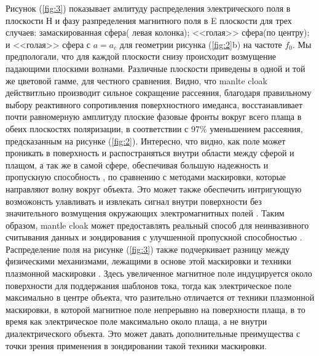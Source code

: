 \documentclass[12pt,a4paper]{article}
\begin{document}
Рисунок (\ref{fig:3}) показывает амлитуду распределения электрического поля в плоскости Н и
фазу разпределения магнитного поля в E плоскости для трех случаев: замаскированная сфера(
левая колонка); <<голая>> сфера(по центру); и <<голая>> сфера с $a=a_c$ для геометрии
рисунка (\ref{fig:2}b) на частоте $f_0$. Мы предпологали, что для каждой плоскости снизу
происходит возмущение падающими плоскими волнами. Различные плоскости приведены в одной и той
же цветовой гамме, для честного сравнения. Видно, что manlte cloak действитльно производит
сильное сокращение рассеяния, благодаря правильному выбору реактивного сопротивления 
поверхностного имеданса, восстанавливает почти равномерную амплитуду плоские фазовые фронты
вокруг всего плаща в обеих плоскостях поляризации, в соответствии с 97\% уменьшением
рассеяния, предсказанным на рисунке (\ref{fig:2}). Интересно, что видно, как поле может
проникать в поверхность и распостраняться внутри области между сферой и плащом, а так же в 
самой сфере, обеспечивая большую надежность и пропускную способность \cite{12}, по сравнению
с методами маскировки, которые направляют волну вокруг объекта. Это может также обеспечить
интригующую возможонсть улавливать и извлекать сигнал внутри поверхности без значительного
возмущения окружающих электромагнитных полей \cite{16}. Таким образом, mantle cloak может
предоставлять реальный способ для неинвазивного считывания данных и зондирования с улучшенной
пропускной способностью \cite{17}. Распределение поля на рисунке (\ref{fig:3}) также 
подчеркивает разницу между физическими механизмами, лежащими в основе этой маскировки и
техники плазмонной маскировки \cite{8}. Здесь увеличенное магнитное поле индуцируется 
около поверхности для поддержания шаблонов тока, тогда как электрическое поле максимально в
центре объекта, что разительно отличается от техники плазмонной маскировки, в которой 
магнитное поле непрерывно на поверхности плаща, в то время как электрическое поле максимально
около плаща, а не внутри диалектрического объекта. Это может давать дополнительные 
преимущества с точки зрения применения в зондировании такой техники маскировки.
\end{document}
